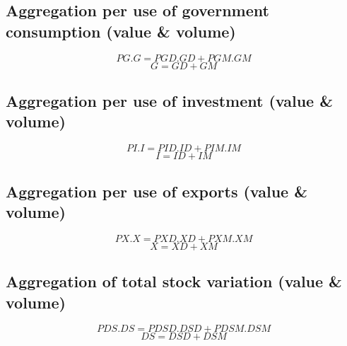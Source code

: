 \documentclass[12pt]{article}
\numberwithin{equation}{section}
\begin{document}
\subsection{Aggregation per use of government consumption 				(value \& volume)}



\begin{dmath}
PG . G = PGD . GD + PGM . GM
\end{dmath}
\begin{dmath}
G = GD + GM
\end{dmath}



\subsection{Aggregation per use of investment 							(value \& volume)}



\begin{dmath}
PI . I = PID . ID + PIM . IM
\end{dmath}
\begin{dmath}
I = ID + IM
\end{dmath}



\subsection{Aggregation per use of exports 								(value \& volume)}



\begin{dmath}
PX . X = PXD . XD + PXM . XM
\end{dmath}
\begin{dmath}
X = XD + XM
\end{dmath}



\subsection{Aggregation of total stock variation 						(value \& volume)}



\begin{dmath}
PDS . DS = PDSD . DSD + PDSM . DSM
\end{dmath}
\begin{dmath}
DS = DSD + DSM
\end{dmath}
\end{document}
